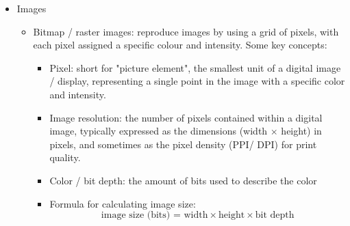 \begin{itemize}
\begin{itemize}
\begin{itemize}
   \item $11110000$: 1111 means 4 bytes is needed to transmit the character, the 0 coming right after the 4 1s means the end of transmitting the number of bytes. The 3 0s afterwards are the data transmitted.
   \item $10......$: 10 means the continuation bytes being sent, the numbers afterwards are transmitted data.
   \item 0001 1111 0110 0000 0100 are the final data received.
   \end{itemize}
\item UTF-8 has been adopted by the internet as the main character encoding system. Some problems:
\begin{itemize}
    \item Due to the variable length, some characterstake more space compared to single-byte encodings. 
    \item ... This can lead to larger file sizes in certain contexts.
    \item The processing required to handle variable length encoding also requires more complex \\ processing compared to fixed-length 
systems such as UTF-32. 
    \end{itemize}
    \end{itemize}
    \item Images
    \begin{itemize}
        \item Bitmap / raster images: reproduce images by using a grid of pixels, with each pixel assigned a specific colour and intensity. Some key concepts:
        \begin{itemize}
            \item Pixel: short for "picture element", the smallest unit of a digital image / display, representing a single point in the image with a specific color and intensity.
            \item Image resolution: the number of pixels contained within a digital image, typically expressed as the dimensions (width $\times$ height) in pixels, and sometimes as the pixel density (PPI/ DPI) for print quality. 
            \item Color / bit depth: the amount of bits used to describe the color
            \item Formula for calculating image size:
            \[\text{image size (bits) = width}\times \text{height} \times \text{bit depth}\]

\end{itemize}
\end{itemize}
\end{itemize}

